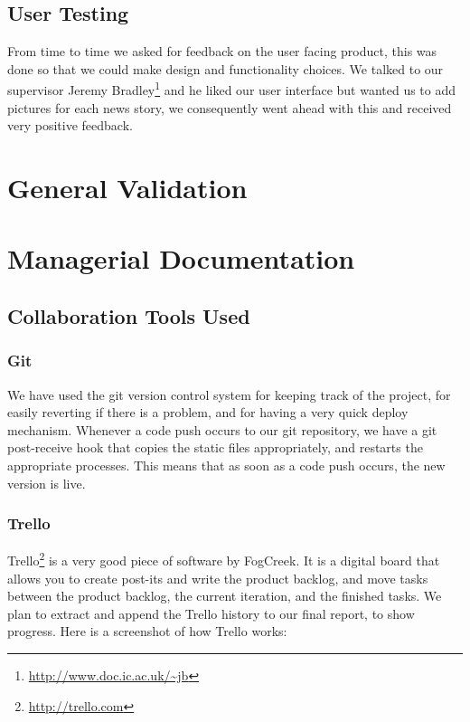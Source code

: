 \documentclass[a4paper,12pt]{article}
\begin{document}
  	\subsection{User Testing}
  	  From time to time we asked for feedback on the user facing product, this was done so that we could make design and functionality choices. We talked to our supervisor Jeremy Bradley\footnote{\url{http://www.doc.ic.ac.uk/~jb}} and he liked our user interface but wanted us to add pictures for each news story, we consequently went ahead with this and received very positive feedback.
	
	\section{General Validation}
	
	\section{Managerial Documentation}
	
		\subsection{Collaboration Tools Used}
		
			\subsubsection{Git}
			
			We have used the git version control system for keeping track of the project, for easily reverting if there is a problem, and for having a very quick deploy mechanism. Whenever a code push occurs to our git repository, we have a git post-receive hook that copies the static files appropriately, and restarts the appropriate processes. This means that as soon as a code push occurs, the new version is live.
			
			\subsubsection{Trello}
			
			Trello\footnote{\url{http://trello.com}} is a very good piece of software by FogCreek. It is a digital board that allows you to create post-its and write the product backlog, and move tasks between the product backlog, the current iteration, and the finished tasks. We plan to extract and append the Trello history to our final report, to show progress. Here is a screenshot of how Trello works:
			
\end{document}
